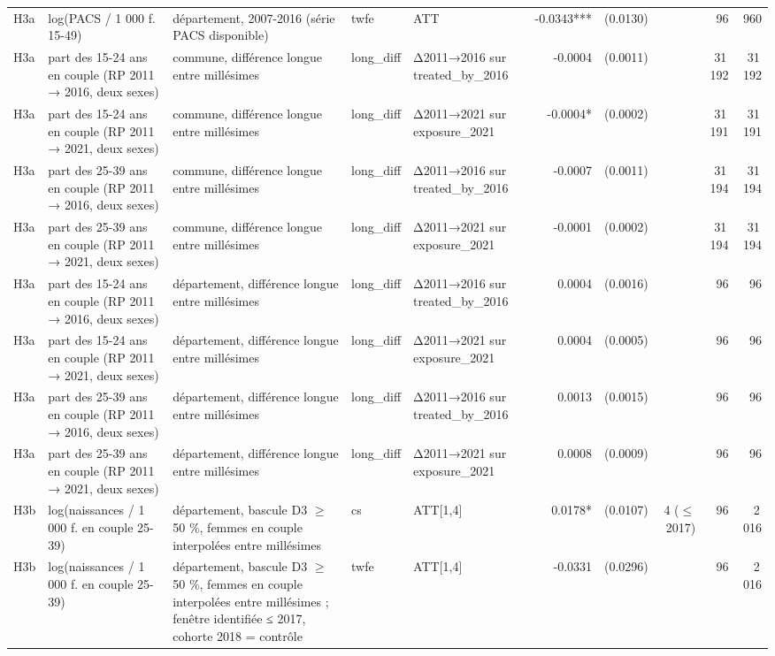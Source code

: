 \begin{table}
\begin{threeparttable}
\begin{tabular}{lp{3.8cm}p{5.5cm}lp{3.5cm}rrrrr}
H3a & log(PACS / 1 000 f. 15-49) & département, 2007-2016 (série PACS disponible) & twfe & ATT & -0.0343*** & (0.0130) &  & 96 & 960 \\
H3a & part des 15-24 ans en couple (RP 2011 → 2016, deux sexes) & commune, différence longue entre millésimes & long\_diff & Δ2011→2016 sur treated\_by\_2016 & -0.0004 & (0.0011) &  & 31\,192 & 31\,192 \\
H3a & part des 15-24 ans en couple (RP 2011 → 2021, deux sexes) & commune, différence longue entre millésimes & long\_diff & Δ2011→2021 sur exposure\_2021 & -0.0004* & (0.0002) &  & 31\,191 & 31\,191 \\
H3a & part des 25-39 ans en couple (RP 2011 → 2016, deux sexes) & commune, différence longue entre millésimes & long\_diff & Δ2011→2016 sur treated\_by\_2016 & -0.0007 & (0.0011) &  & 31\,194 & 31\,194 \\
H3a & part des 25-39 ans en couple (RP 2011 → 2021, deux sexes) & commune, différence longue entre millésimes & long\_diff & Δ2011→2021 sur exposure\_2021 & -0.0001 & (0.0002) &  & 31\,194 & 31\,194 \\
H3a & part des 15-24 ans en couple (RP 2011 → 2016, deux sexes) & département, différence longue entre millésimes & long\_diff & Δ2011→2016 sur treated\_by\_2016 & 0.0004 & (0.0016) &  & 96 & 96 \\
H3a & part des 15-24 ans en couple (RP 2011 → 2021, deux sexes) & département, différence longue entre millésimes & long\_diff & Δ2011→2021 sur exposure\_2021 & 0.0004 & (0.0005) &  & 96 & 96 \\
H3a & part des 25-39 ans en couple (RP 2011 → 2016, deux sexes) & département, différence longue entre millésimes & long\_diff & Δ2011→2016 sur treated\_by\_2016 & 0.0013 & (0.0015) &  & 96 & 96 \\
H3a & part des 25-39 ans en couple (RP 2011 → 2021, deux sexes) & département, différence longue entre millésimes & long\_diff & Δ2011→2021 sur exposure\_2021 & 0.0008 & (0.0009) &  & 96 & 96 \\
H3b & log(naissances / 1 000 f. en couple 25-39) & département, bascule D3 $\geq$ 50 \%, femmes en couple interpolées entre millésimes & cs & ATT[1,4] & 0.0178* & (0.0107) & 4 ($\leq$ 2017) & 96 & 2\,016 \\
H3b & log(naissances / 1 000 f. en couple 25-39) & département, bascule D3 $\geq$ 50 \%, femmes en couple interpolées entre millésimes ; fenêtre identifiée ≤ 2017, cohorte 2018 = contrôle & twfe & ATT[1,4] & -0.0331 & (0.0296) &  & 96 & 2\,016 \\

\end{tabular}
\end{threeparttable}
\end{table}
